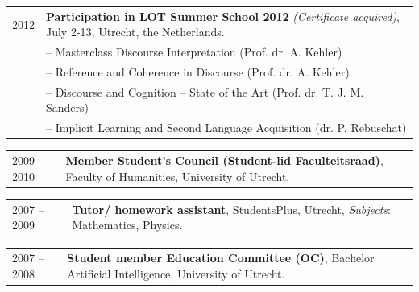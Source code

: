 \documentclass[a4paper,10pt]{article}
\def\leftcolwidth{.12\textwidth}
\def\tablevspace{10pt}
\begin{document}
\vspace{\tablevspace}

\noindent
\begin{tabularx}{\textwidth}{ p{\leftcolwidth} X }
  2012 & \textbf{Participation in LOT Summer School 2012} 
         \textit{(Certificate acquired)}, July 2-13,
         Utrecht, the Netherlands.\\
       & -- {Masterclass Discourse Interpretation} (Prof. dr. A. Kehler)\\
       & -- {Reference and Coherence in Discourse} (Prof. dr. A. Kehler)\\
       & -- {Discourse and Cognition -- State of the Art} (Prof. dr. T. J. M. Sanders)\\
       & -- {Implicit Learning and Second Language Acquisition}
         (dr. P. Rebuschat)\\
\end{tabularx}

\vspace{\tablevspace}

\noindent
\begin{tabularx}{\textwidth}{ p{\leftcolwidth} X }
  2009 -- 2010
  & \textbf{Member Student's Council (Student-lid Faculteitsraad)},
    Faculty of Humanities, University of Utrecht.\\
\end{tabularx}

\vspace{\tablevspace}

%

\noindent
\begin{tabularx}{\textwidth}{ p{\leftcolwidth} X }
  2007 -- 2009
  & \textbf{Tutor/ homework assistant}, StudentsPlus, Utrecht,
    \textit{Subjects}: Mathematics, Physics.
\end{tabularx}

\vspace{\tablevspace}

\noindent
\begin{tabularx}{\textwidth}{ p{\leftcolwidth} X }
  2007 -- 2008
  & \textbf{Student member Education Committee (OC)},
    Bachelor Artificial Intelligence, University of Utrecht.\\
\end{tabularx}
\end{document}

